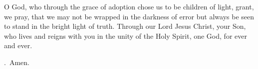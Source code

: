 \lettrine[lines=3]{O}{} God, who through the grace of adoption
chose us to be children of light,
grant, we pray,
that we may not be wrapped in the darkness of error
but always be seen to stand in the bright light of truth.
Through our Lord Jesus Christ, your Son,
who lives and reigns with you in the unity of the Holy Spirit,
one God, for ever and ever. \par \Rbar.~Amen.
